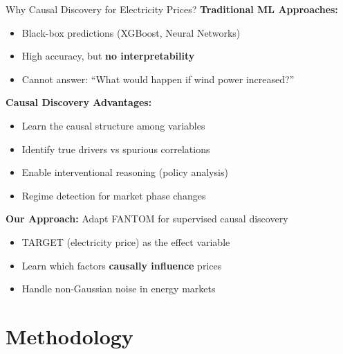 \documentclass[aspectratio=169]{beamer}
\begin{document}
\begin{frame}{Why Causal Discovery for Electricity Prices?}
\textbf{Traditional ML Approaches:}
\begin{itemize}
    \item Black-box predictions (XGBoost, Neural Networks)
    \item High accuracy, but \textbf{no interpretability}
    \item Cannot answer: ``What would happen if wind power increased?''
\end{itemize}

\vspace{0.3cm}
\textbf{Causal Discovery Advantages:}
\begin{itemize}
    \item \textcolor{reprogreen}{Learn the causal structure} among variables
    \item \textcolor{reprogreen}{Identify true drivers} vs spurious correlations
    \item \textcolor{reprogreen}{Enable interventional reasoning} (policy analysis)
    \item \textcolor{reprogreen}{Regime detection} for market phase changes
\end{itemize}

\vspace{0.3cm}
\textbf{Our Approach:} Adapt FANTOM for supervised causal discovery
\begin{itemize}
    \item TARGET (electricity price) as the effect variable
    \item Learn which factors \textbf{causally influence} prices
    \item Handle non-Gaussian noise in energy markets
\end{itemize}
\end{frame}

\section{Methodology}
\end{document}

